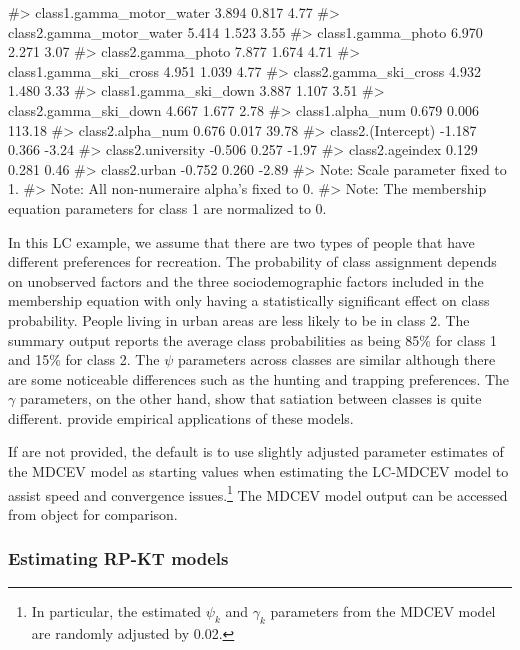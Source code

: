 \begin{example}
#> class1.gamma_motor_water       3.894   0.817   4.77
#> class2.gamma_motor_water       5.414   1.523   3.55
#> class1.gamma_photo             6.970   2.271   3.07
#> class2.gamma_photo             7.877   1.674   4.71
#> class1.gamma_ski_cross         4.951   1.039   4.77
#> class2.gamma_ski_cross         4.932   1.480   3.33
#> class1.gamma_ski_down          3.887   1.107   3.51
#> class2.gamma_ski_down          4.667   1.677   2.78
#> class1.alpha_num               0.679   0.006 113.18
#> class2.alpha_num               0.676   0.017  39.78
#> class2.(Intercept)            -1.187   0.366  -3.24
#> class2.university             -0.506   0.257  -1.97
#> class2.ageindex                0.129   0.281   0.46
#> class2.urban                  -0.752   0.260  -2.89
#> Note: Scale parameter fixed to 1. 
#> Note: All non-numeraire alpha's fixed to 0. 
#> Note: The membership equation parameters for class 1 are normalized to 0.
\end{example}

In this LC example, we assume that there are two types of people that
have different preferences for recreation. The probability of class
assignment depends on unobserved factors and the three sociodemographic
factors included in the membership equation with only 
having a statistically significant effect on class probability. People
living in urban areas are less likely to be in class 2. The summary
output reports the average class probabilities as being 85\% for class 1
and 15\% for class 2. The \(\psi\) parameters across classes are similar
although there are some noticeable differences such as the hunting and
trapping preferences. The \(\gamma\) parameters, on the other hand, show
that satiation between classes is quite different.
\citet{sobhanilatent2013, kuriyamalatent2010} provide empirical
applications of these models.

If  are not provided, the default is to use
slightly adjusted parameter estimates of the MDCEV model as starting
values when estimating the LC-MDCEV model to assist speed and
convergence issues.\footnote{In particular, the estimated \(\psi_k\) and
  \(\gamma_k\) parameters from the MDCEV model are randomly adjusted by
  0.02.} The MDCEV model output can be accessed from
 object for comparison.

\hypertarget{estimating-rp-kt-models}{%
\subsubsection{Estimating RP-KT models}\label{estimating-rp-kt-models}}

